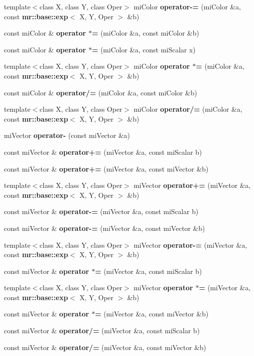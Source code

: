 \begin{CompactItemize}
\item 
template$<$class X, class Y, class Oper$>$ mi\-Color {\bf operator-=} (mi\-Color \&a, const {\bf mr::base::exp}$<$ X, Y, Oper $>$ \&b)
\item 
const mi\-Color \& {\bf operator $\ast$=} (mi\-Color \&a, const mi\-Color \&b)
\item 
const mi\-Color \& {\bf operator $\ast$=} (mi\-Color \&a, const mi\-Scalar x)
\item 
template$<$class X, class Y, class Oper$>$ mi\-Color {\bf operator $\ast$=} (mi\-Color \&a, const {\bf mr::base::exp}$<$ X, Y, Oper $>$ \&b)
\item 
const mi\-Color \& {\bf operator/=} (mi\-Color \&a, const mi\-Color \&b)
\item 
template$<$class X, class Y, class Oper$>$ mi\-Color {\bf operator/=} (mi\-Color \&a, const {\bf mr::base::exp}$<$ X, Y, Oper $>$ \&b)
\item 
mi\-Vector {\bf operator-} (const mi\-Vector \&a)
\item 
const mi\-Vector \& {\bf operator+=} (mi\-Vector \&a, const mi\-Scalar b)
\item 
const mi\-Vector \& {\bf operator+=} (mi\-Vector \&a, const mi\-Vector \&b)
\item 
template$<$class X, class Y, class Oper$>$ mi\-Vector {\bf operator+=} (mi\-Vector \&a, const {\bf mr::base::exp}$<$ X, Y, Oper $>$ \&b)
\item 
const mi\-Vector \& {\bf operator-=} (mi\-Vector \&a, const mi\-Scalar b)
\item 
const mi\-Vector \& {\bf operator-=} (mi\-Vector \&a, const mi\-Vector \&b)
\item 
template$<$class X, class Y, class Oper$>$ mi\-Vector {\bf operator-=} (mi\-Vector \&a, const {\bf mr::base::exp}$<$ X, Y, Oper $>$ \&b)
\item 
const mi\-Vector \& {\bf operator $\ast$=} (mi\-Vector \&a, const mi\-Scalar b)
\item 
template$<$class X, class Y, class Oper$>$ mi\-Vector {\bf operator $\ast$=} (mi\-Vector \&a, const {\bf mr::base::exp}$<$ X, Y, Oper $>$ \&b)
\item 
const mi\-Vector \& {\bf operator $\ast$=} (mi\-Vector \&a, const mi\-Vector \&b)
\item 
const mi\-Vector \& {\bf operator/=} (mi\-Vector \&a, const mi\-Scalar b)
\item 
const mi\-Vector \& {\bf operator/=} (mi\-Vector \&a, const mi\-Vector \&b)
\item 

\end{CompactItemize}
